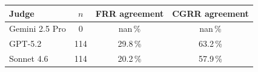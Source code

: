 \begin{tabular}{lccc}
\toprule
\textbf{Judge} & $n$ & \textbf{FRR agreement} & \textbf{CGRR agreement} \\
\midrule
Gemini 2.5 Pro & 0 & nan\,\% & nan\,\% \\
GPT-5.2 & 114 & 29.8\,\% & 63.2\,\% \\
Sonnet 4.6 & 114 & 20.2\,\% & 57.9\,\% \\
\bottomrule
\end{tabular}